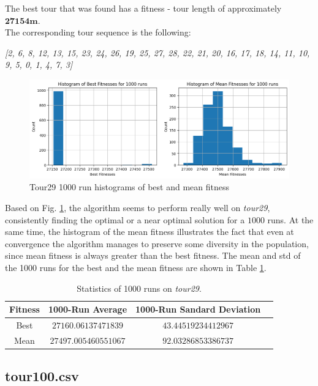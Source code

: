 \documentclass[a4paper,10pt]{article}
\begin{document}
The best tour that was found has a fitness - tour length of approximately $\textbf{27154m}$.\\
The corresponding tour sequence is the following:
\begin{center}
\textit{[2, 6, 8, 12, 13, 15, 23, 24, 26, 19, 25, 27, 28, 22, 21, 20, 16, 17, 18, 14, 11, 10, 9, 5, 0, 1, 4, 7, 3]}
\end{center}

\begin{figure}[H]
     \centering
     \includegraphics[width=\textwidth]{results/4.2/tour29_histogram.png}
     \caption{Tour29 1000 run histograms of best and mean fitness}
     \label{fig:tour29histogram}
\end{figure}

Based on Fig. \ref{fig:tour29histogram}, the algorithm seems to perform really well on \textit{tour29}, consistently finding the optimal or a near optimal solution for a $1000$ runs. At the same time, the histogram of the mean fitness illustrates the fact that even at convergence the algorithm manages to preserve some diversity in the population, since mean fitness is always greater than the best fitness. The mean and std of the 1000 runs for the best and the mean fitness are shown in Table \ref{table:1000run_statistics}.

\begin{table}[H]
\centering
\begin{tabular}{ |c|c|c|c| } 
\hline
Fitness & 1000-Run Average & 1000-Run Sandard Deviation\\
\hline
Best & $27160.06137471839$ & $43.44519234412967$ \\ 
Mean & $27497.005460551067$ & $92.03286853386737$ \\ 
\hline
\end{tabular}
\caption{Statistics of 1000 runs on \textit{tour29}.}
\label{table:1000run_statistics}
\end{table}


\subsection{tour100.csv} \label{ss:tour100}
\end{document}
